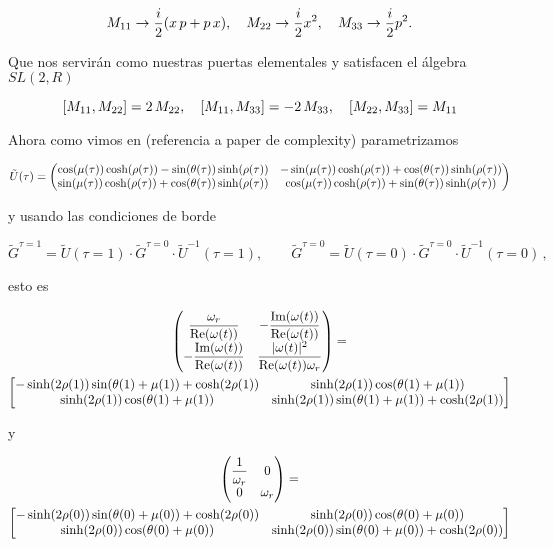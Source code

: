 \documentclass[../Main.tex]{subfiles}
\begin{document}
\begin{equation}
M_{11}\rightarrow \frac{i}{2}( x \, p+p\, x)\qc M_{22}\rightarrow \frac{i}{2} x^2\qc M_{33}\rightarrow \frac{i}{2} p^2.
\end{equation}

Que nos servirán como nuestras puertas elementales y satisfacen el álgebra $SL(2,R)$

\begin{equation}
\comm{M_{11}}{ M_{22}}=2\,M_{22}\qc\comm{M_{11}}{M_{33}}=-2\,M_{33}\qc \comm{M_{22}}{M_{33}}= M_{11}
\end{equation}

Ahora como vimos en (referencia a paper de complexity) parametrizamos

\begin{equation}
\label{param}
\tilde U(\tau)=\mqty(
\cos(\mu(\tau))\cosh(\rho(\tau))-\sin(\theta(\tau))\sinh(\rho(\tau))& -\sin(\mu(\tau))\cosh(\rho(\tau))+\cos(\theta(\tau))\sinh(\rho(\tau))\\
\sin(\mu(\tau))\cosh(\rho(\tau))+\cos(\theta(\tau))\sinh(\rho(\tau))&  \cos(\mu(\tau))\cosh(\rho(\tau))+\sin(\theta(\tau))\sinh(\rho(\tau)))
\end{equation}


y usando las condiciones de borde

\begin{equation}
\tilde G^{\tau=1}=\tilde U(\tau=1)\cdot \tilde G^{\tau=0}\cdot\tilde U^{-1}(\tau=1),\qquad \tilde G^{\tau=0}=\tilde U(\tau=0)\cdot\tilde  G^{\tau=0}\cdot\tilde U^{-1}(\tau=0)\,,
\end{equation}

esto es 

\begin{multline}
\mqty(\dfrac{\omega_r}{ \text {Re}  (\omega(t))} & -\dfrac{\text {Im}  (\omega(t))}{\text {Re}  (\omega(t))} \\ -\dfrac{ \text {Im}  (\omega(t))}{\text {Re}  (\omega(t))} & \dfrac{|\omega(t) |^2}{\text {Re}  (\omega(t))\omega_r})=
\\
\bmqty{ -\sinh (2 \rho(1) ) \sin (\theta(1) +\mu(1) )+\cosh(2\rho(1) ) & \sinh (2 \rho(1) ) \cos (\theta(1) +\mu(1) ) \\
\sinh (2 \rho(1) ) \cos (\theta(1) +\mu(1) ) & \sinh (2 \rho(1) ) \sin (\theta(1) +\mu(1) )+\cosh(2\rho(1) )}
\end{multline}

y 

\begin{multline}
\mqty(\dfrac{1}{\omega_r} & 0 \\ 0 & \omega_r)= \\
\bmqty{ -\sinh (2 \rho(0) ) \sin (\theta(0) +\mu(0) )+\cosh(2\rho(0) ) & \sinh (2 \rho(0) ) \cos (\theta(0) +\mu(0) ) \\
\sinh (2 \rho(0) ) \cos (\theta(0) +\mu(0) ) & \sinh (2 \rho(0) ) \sin (\theta(0) +\mu(0) )+\cosh(2\rho(0) )}
\end{multline}
\end{document}
